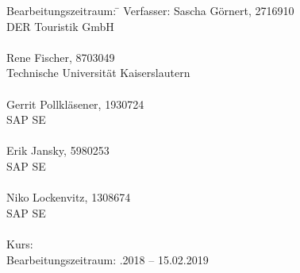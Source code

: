 \begin{titlepage}
\begin{center}
\begin{minipage}{\textwidth}
		\begin{tabbing}
			Bearbeitungszeitraum: \hspace{0.85cm}\=\kill
			Verfasser: \> Sascha Görnert, 2716910 \\
			\> DER Touristik GmbH \\
			\> \\
			\> Rene Fischer, 8703049 \\
			\> Technische Universität Kaiserslautern \\
			\> \\
			\> Gerrit Pollkläsener, 1930724 \\
			\> SAP SE \\
			\> \\
			\> Erik Jansky, 5980253 \\
			\> SAP SE \\
			\> \\
			\> Niko Lockenvitz, 1308674 \\
			\> SAP SE \\
			\> \\[1.5mm]
			Kurs: \> \DieKursbezeichnung \\[1.5mm]
			Bearbeitungszeitraum: .2018 -- 15.02.2019
	\end{tabbing}

	\end{minipage}

\end{center}

\end{titlepage}
